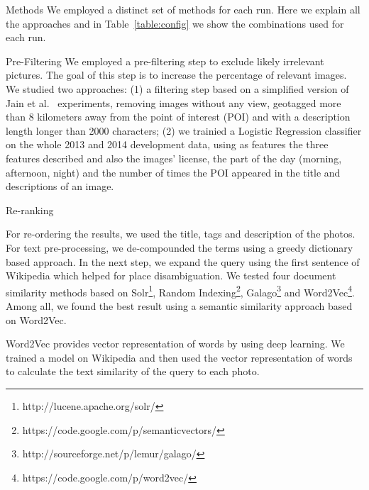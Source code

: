 \documentclass{acm_proc_article-me}
\begin{document}
\begin{section}{Methods}
We employed a distinct set of methods for each run. 
Here we explain all the approaches and in Table~\ref{table:config} we show the combinations used for each run.

\begin{subsection}{Pre-Filtering}
We employed a pre-filtering step to exclude likely irrelevant pictures.
The goal of this step is to increase the percentage of relevant images.
We studied two approaches: (1) a filtering step based on a simplified version of Jain et al.~\cite{wsp13} experiments, removing images without any view, geotagged more than 8 kilometers away from the point of interest (POI) and with a description length longer than 2000 characters; 
(2) we trainied a Logistic Regression classifier on the whole 2013 and 2014 development data, using as features the three features described and also the images' license, the part of the day (morning, afternoon, night) and the number of times the POI appeared in the title and descriptions of an image.
\end{subsection}


\begin{subsection}{Re-ranking}

For re-ordering the results, we used the title, tags and description of the photos. For text pre-processing, we de-compounded the terms using a greedy dictionary based approach. In the next step, we expand the query using the first sentence of Wikipedia which helped for place disambiguation. We tested four document similarity methods based on Solr\footnote{http://lucene.apache.org/solr/}, Random Indexing\footnote{https://code.google.com/p/semanticvectors/}, Galago\footnote{http://sourceforge.net/p/lemur/galago/} and Word2Vec\footnote{https://code.google.com/p/word2vec/}\cite{word2vec}. Among all, we found the best result using a semantic similarity approach based on Word2Vec.

Word2Vec provides vector representation of words by using deep learning. We trained a model on Wikipedia and then used the vector representation of words to calculate the text similarity of the query to each photo.


\end{subsection}
\end{section}
\end{document}
